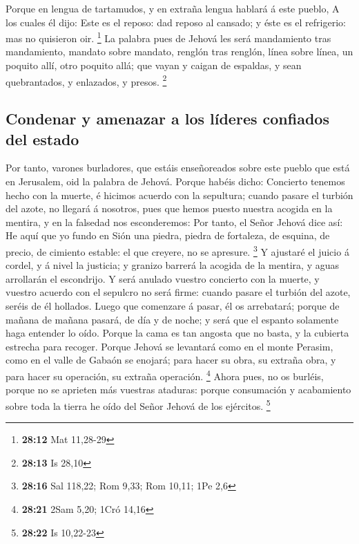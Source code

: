  Porque en lengua de tartamudos, y en extraña lengua
hablará á este pueblo,  A los cuales él dijo: Este es el
reposo: dad reposo al cansado; y éste es el refrigerio: mas no quisieron
oir. \footnote{\textbf{28:12} Mat 11,28-29}  La palabra
pues de Jehová les será mandamiento tras mandamiento, mandato sobre
mandato, renglón tras renglón, línea sobre línea, un poquito allí, otro
poquito allá; que vayan y caigan de espaldas, y sean quebrantados, y
enlazados, y presos. \footnote{\textbf{28:13} Is 28,10}

\hypertarget{condenar-y-amenazar-a-los-luxedderes-confiados-del-estado}{%
\subsection{Condenar y amenazar a los líderes confiados del
estado}\label{condenar-y-amenazar-a-los-luxedderes-confiados-del-estado}}

 Por tanto, varones burladores, que estáis enseñoreados
sobre este pueblo que está en Jerusalem, oid la palabra de Jehová.
 Porque habéis dicho: Concierto tenemos hecho con la
muerte, é hicimos acuerdo con la sepultura; cuando pasare el turbión del
azote, no llegará á nosotros, pues que hemos puesto nuestra acogida en
la mentira, y en la falsedad nos esconderemos:  Por
tanto, el Señor Jehová dice así: He aquí que yo fundo en Sión una
piedra, piedra de fortaleza, de esquina, de precio, de cimiento estable:
el que creyere, no se apresure. \footnote{\textbf{28:16} Sal 118,22; Rom
  9,33; Rom 10,11; 1Pe 2,6}  Y ajustaré el juicio á
cordel, y á nivel la justicia; y granizo barrerá la acogida de la
mentira, y aguas arrollarán el escondrijo.  Y será
anulado vuestro concierto con la muerte, y vuestro acuerdo con el
sepulcro no será firme: cuando pasare el turbión del azote, seréis de él
hollados.  Luego que comenzare á pasar, él os arrebatará;
porque de mañana de mañana pasará, de día y de noche; y será que el
espanto solamente haga entender lo oído.  Porque la cama
es tan angosta que no basta, y la cubierta estrecha para recoger.
 Porque Jehová se levantará como en el monte Perasim,
como en el valle de Gabaón se enojará; para hacer su obra, su extraña
obra, y para hacer su operación, su extraña operación. \footnote{\textbf{28:21}
  2Sam 5,20; 1Cró 14,16}  Ahora pues, no os burléis,
porque no se aprieten más vuestras ataduras: porque consumación y
acabamiento sobre toda la tierra he oído del Señor Jehová de los
ejércitos. \footnote{\textbf{28:22} Is 10,22-23}

